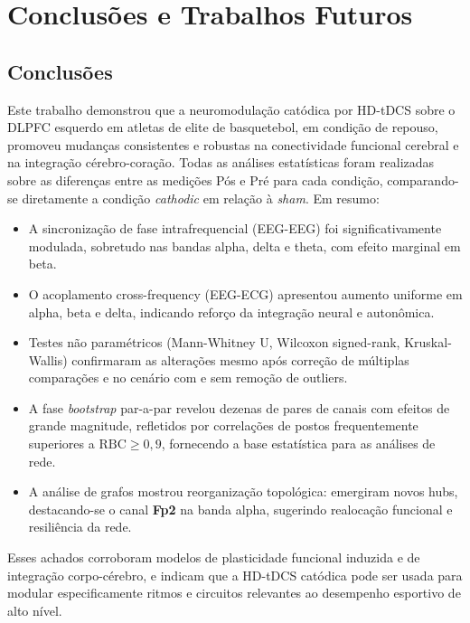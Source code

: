 \chapter{Conclusões e Trabalhos Futuros}
\label{chap:conclusoes_e_trabalhos_futuros}

\section{Conclusões}
Este trabalho demonstrou que a neuromodulação catódica por HD-tDCS sobre o DLPFC esquerdo em atletas de elite de basquetebol, em condição de repouso, promoveu mudanças consistentes e robustas na conectividade funcional cerebral e na integração cérebro-coração. Todas as análises estatísticas foram realizadas sobre as diferenças entre as medições Pós e Pré para cada condição, comparando-se diretamente a condição \emph{cathodic} em relação à \emph{sham}. Em resumo:
\begin{itemize}
  \item A sincronização de fase intrafrequencial (EEG-EEG) foi significativamente modulada, sobretudo nas bandas alpha, delta e theta, com efeito marginal em beta.
  \item O acoplamento cross-frequency (EEG-ECG) apresentou aumento uniforme em alpha, beta e delta, indicando reforço da integração neural e autonômica.
  \item Testes não paramétricos (Mann-Whitney U, Wilcoxon signed-rank, Kruskal-Wallis) confirmaram as alterações mesmo após correção de múltiplas comparações e no cenário com e sem remoção de outliers.
  \item A fase \emph{bootstrap} par-a-par revelou dezenas de pares de canais com efeitos de grande magnitude, refletidos por correlações de postos frequentemente superiores a $\mathrm{RBC}\ge0{,}9$, fornecendo a base estatística para as análises de rede.
  \item A análise de grafos mostrou reorganização topológica: emergiram novos hubs, destacando-se o canal \textbf{Fp2} na banda alpha, sugerindo realocação funcional e resiliência da rede.
\end{itemize}
  
Esses achados corroboram modelos de plasticidade funcional induzida e de integração corpo-cérebro, e indicam que a HD-tDCS catódica pode ser usada para modular especificamente ritmos e circuitos relevantes ao desempenho esportivo de alto nível.

